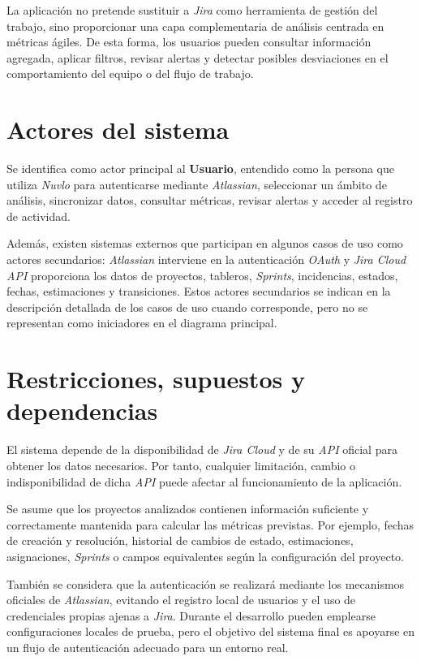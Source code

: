 La aplicación no pretende sustituir a \textit{Jira} como herramienta de gestión del trabajo, sino proporcionar una capa complementaria de análisis centrada en métricas ágiles. De esta forma, los usuarios pueden consultar información agregada, aplicar filtros, revisar alertas y detectar posibles desviaciones en el comportamiento del equipo o del flujo de trabajo.

\section{Actores del sistema}

Se identifica como actor principal al \textbf{Usuario}, entendido como la persona que utiliza \textit{Nuvlo} para autenticarse mediante \textit{Atlassian}, seleccionar un ámbito de análisis, sincronizar datos, consultar métricas, revisar alertas y acceder al registro de actividad.

Además, existen sistemas externos que participan en algunos casos de uso como actores secundarios: \textit{Atlassian} interviene en la autenticación \textit{OAuth} y \textit{Jira Cloud} \textit{API} proporciona los datos de proyectos, tableros, \textit{Sprints}, incidencias, estados, fechas, estimaciones y transiciones. Estos actores secundarios se indican en la descripción detallada de los casos de uso cuando corresponde, pero no se representan como iniciadores en el diagrama principal.

\section{Restricciones, supuestos y dependencias}

El sistema depende de la disponibilidad de \textit{Jira Cloud} y de su \textit{API} oficial para obtener los datos necesarios. Por tanto, cualquier limitación, cambio o indisponibilidad de dicha \textit{API} puede afectar al funcionamiento de la aplicación.

Se asume que los proyectos analizados contienen información suficiente y correctamente mantenida para calcular las métricas previstas. Por ejemplo, fechas de creación y resolución, historial de cambios de estado, estimaciones, asignaciones, \textit{Sprints} o campos equivalentes según la configuración del proyecto.

También se considera que la autenticación se realizará mediante los mecanismos oficiales de \textit{Atlassian}, evitando el registro local de usuarios y el uso de credenciales propias ajenas a \textit{Jira}. Durante el desarrollo pueden emplearse configuraciones locales de prueba, pero el objetivo del sistema final es apoyarse en un flujo de autenticación adecuado para un entorno real.

